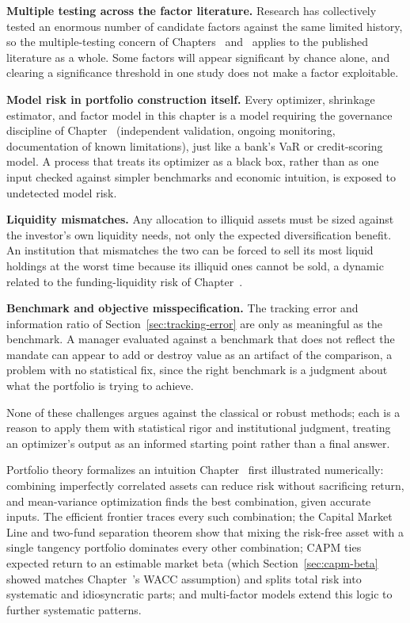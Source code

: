 \documentclass[../ai_in_finance]{subfiles}
\begin{document}
\textbf{Multiple testing across the factor literature.} Research has collectively tested an enormous number of candidate factors against the same limited history, so the multiple-testing concern of Chapters~ and~ applies to the published literature as a whole. Some factors will appear significant by chance alone, and clearing a significance threshold in one study does not make a factor exploitable.

\textbf{Model risk in portfolio construction itself.} Every optimizer, shrinkage estimator, and factor model in this chapter is a model requiring the governance discipline of Chapter~ (independent validation, ongoing monitoring, documentation of known limitations), just like a bank's VaR or credit-scoring model.
A process that treats its optimizer as a black box, rather than as one input checked against simpler benchmarks and economic intuition, is exposed to undetected model risk.

\textbf{Liquidity mismatches.} Any allocation to illiquid assets must be sized against the investor's own liquidity needs, not only the expected diversification benefit. An institution that mismatches the two can be forced to sell its most liquid holdings at the worst time because its illiquid ones cannot be sold, a dynamic related to the funding-liquidity risk of Chapter~.

\textbf{Benchmark and objective misspecification.} The tracking error and information ratio of Section~\ref{sec:tracking-error} are only as meaningful as the benchmark. A manager evaluated against a benchmark that does not reflect the mandate can appear to add or destroy value as an artifact of the comparison, a problem with no statistical fix, since the right benchmark is a judgment about what the portfolio is trying to achieve.

None of these challenges argues against the classical or robust methods; each is a reason to apply them with statistical rigor and institutional judgment, treating an optimizer's output as an informed starting point rather than a final answer.


Portfolio theory formalizes an intuition Chapter~ first illustrated numerically: combining imperfectly correlated assets can reduce risk without sacrificing return, and mean-variance optimization finds the best combination, given accurate inputs. The efficient frontier traces every such combination; the Capital Market Line and two-fund separation theorem show that mixing the risk-free asset with a single tangency portfolio dominates every other combination; CAPM ties expected return to an estimable market beta (which Section~\ref{sec:capm-beta} showed matches Chapter~'s WACC assumption) and splits total risk into systematic and idiosyncratic parts; and multi-factor models extend this logic to further systematic patterns.
\end{document}
